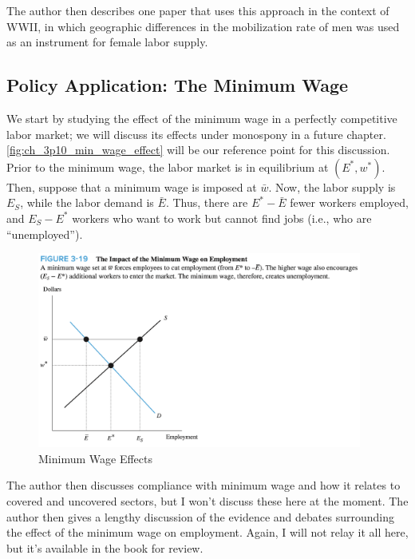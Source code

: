 \FloatBarrier

The author then describes one paper 
that uses this approach in the context of 
WWII, in which geographic differences in the 
mobilization rate of men was used as 
an instrument for female labor supply.

\subsection{Policy Application: The Minimum Wage}

We start by studying the effect of the 
minimum wage in a perfectly competitive labor market;
we will discuss its effects under monospony in a future 
chapter.
\autoref{fig:ch_3p10_min_wage_effect}
will be our reference point for this discussion. 
Prior to the minimum wage, 
the labor market is in equilibrium at
$(E^*, w^*)$. Then, suppose that a minimum wage
is imposed at $\bar{w}$. Now, the labor supply is 
$E_S$, while the labor demand is 
$\bar{E}$. Thus, there are 
$E^* - \bar{E}$ fewer workers employed,
and $E_S - E^*$ workers who want to work
but cannot find jobs (i.e., who are ``unemployed''). 

\FloatBarrier

\begin{figure}[!htb]
    \centering
        \includegraphics[width=0.95\textwidth]{../input/ch_3p10_min_wage_effect.png}
    \caption{Minimum Wage Effects}
    \label{fig:ch_3p10_min_wage_effect}
\end{figure}

\FloatBarrier

The author then discusses 
compliance with minimum wage and how it 
relates to covered and uncovered sectors, but I won't 
discuss these here at the moment.
The author then gives a lengthy discussion of 
the evidence and debates 
surrounding the effect of the minimum wage on employment.
Again, I will not 
relay it all here, but it's available in the book 
for review.